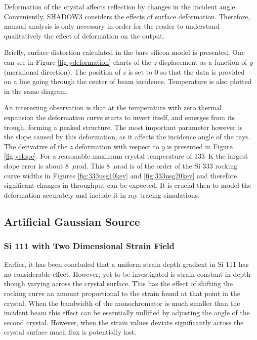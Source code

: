 \documentclass[preprint]{iucr}              %
\begin{document}
Deformation of the crystal affects reflection by changes in the incident angle. Conveniently, SHADOW3 considers the effects of surface deformation. Therefore, manual analysis is only necessary in order for the reader to understand qualitatively the effect of deformation on the output.

Briefly, surface distortion calculated in the bare silicon model is presented. One can see in Figure \ref{fig:ydeformation} charts of the \textit{z} displacement as a function of \textit{y} (meridional direction). The position of \textit{x} is set to 0 so that the data is provided on a line going through the center of beam incidence. Temperature is also plotted in the same diagram.

An interesting observation is that at the temperature with zero thermal expansion the deformation curve starts to invert itself, and emerges from its trough, forming a peaked structure. The most important parameter however is the slope caused by this deformation, as it affects the incidence angle of the rays. The derivative of the \textit{z} deformation with respect to \textit{y} is presented in Figure \ref{fig:yslope}. For a reasonable maximum crystal temperature of 133~K the largest slope error is about 8~$\mu$rad. This 8~$\mu$rad is of the order of the Si 333 rocking curve widths in Figures \ref{fig:333usg10kev} and \ref{fig:333usg20kev} and therefore significant changes in throughput can be expected. It is crucial then to model the deformation accurately and include it in ray tracing simulations.

\subsection{Artificial Gaussian Source}\label{gaussian}
\subsubsection{Si 111 with Two Dimensional Strain Field}\label{111simulation}
Earlier, it has been concluded that a uniform strain depth gradient in Si 111 has no considerable effect. However, yet to be investigated is strain constant in depth though varying across the crystal surface. This has the effect of shifting the rocking curve an amount proportional to the strain found at that point in the crystal. When the bandwidth of the monochromator is much smaller than the incident beam this effect can be essentially nullified by adjusting the angle of the second crystal. However, when the strain values deviate significantly across the crystal surface much flux is potentially lost.
\end{document}
